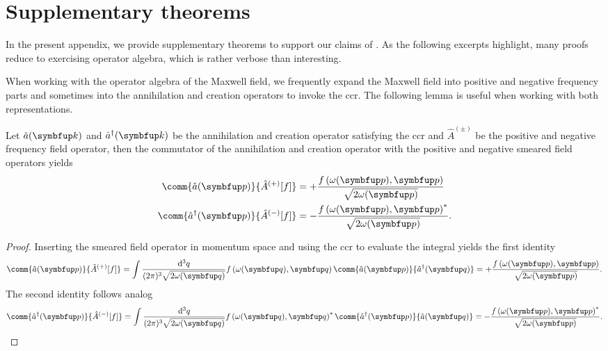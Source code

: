 \chapter{Supplementary theorems}

In the present appendix, we provide supplementary theorems to support our claims of .
As the following excerpts highlight, many proofs reduce to exercising operator algebra, which is rather verbose than interesting.

When working with the operator algebra of the Maxwell field, we frequently expand the Maxwell field into positive and negative frequency parts and sometimes into the annihilation and creation operators to invoke the \gls{ccr}.
The following lemma is useful when working with both representations.
\begin{lemma}\label{th:annihilation_field_commutators}
	Let $\hat{a}(\vb{k})$ and $\hat{a}^\dagger(\vb{k})$ be the annihilation and creation operator satisfying the \gls{ccr} and $\hat{A}^{(\pm)}$ be the positive and negative frequency field operator, then the commutator of the annihilation and creation operator with the positive and negative smeared field operators yields
	\begin{align}
		\comm{\hat{a}(\vb{p})}{\hat{A}^{(+)}[f]}
		&=
		+\frac{f\left(\omega(\vb{p}),\vb{p}\right)}{\sqrt{2\omega(\vb{p})}}
		\\
		\comm{\hat{a}^\dagger(\vb{p})}{\hat{A}^{(-)}[f]}
		&=
		-\frac{f\left(\omega(\vb{p}),\vb{p}\right)^*}{\sqrt{2\omega(\vb{p})}}
		.
	\end{align}
\end{lemma}
\begin{proof}
	Inserting the smeared field operator in momentum space and using the \gls{ccr} to evaluate the integral yields the first identity
	\begin{equation}
		\comm{\hat{a}(\vb{p})}{\hat{A}^{(+)}[f]}
		=
		\int\frac{\dd[3]{q}}{(2\pi)^3\sqrt{2\omega(\vb{q})}}
		f\left(\omega(\vb{q}),\vb{q}\right)
		\comm{\hat{a}(\vb{p})}{\hat{a}^\dagger(\vb{q})}
		=
		+\frac{f\left(\omega(\vb{p}),\vb{p}\right)}{\sqrt{2\omega(\vb{p})}}
		.
	\end{equation}
	The second identity follows analog
	\begin{equation}
		\comm{\hat{a}^\dagger(\vb{p})}{\hat{A}^{(-)}[f]}
		=
		\int\frac{\dd[3]{q}}{(2\pi)^3\sqrt{2\omega(\vb{q})}}
		f\left(\omega(\vb{q}),\vb{q}\right)^*
		\comm{\hat{a}^\dagger(\vb{p})}{\hat{a}(\vb{q})}
		=
		-\frac{f\left(\omega(\vb{p}),\vb{p}\right)^*}{\sqrt{2\omega(\vb{p})}}
		.
	\end{equation}
\end{proof}
